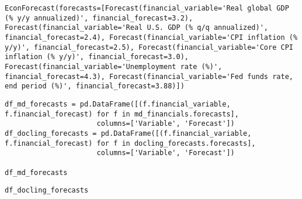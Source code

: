 \begin{verbatim}
EconForecast(forecasts=[Forecast(financial_variable='Real global GDP (% y/y annualized)', financial_forecast=3.2), Forecast(financial_variable='Real U.S. GDP (% q/q annualized)', financial_forecast=2.4), Forecast(financial_variable='CPI inflation (% y/y)', financial_forecast=2.5), Forecast(financial_variable='Core CPI inflation (% y/y)', financial_forecast=3.0), Forecast(financial_variable='Unemployment rate (%)', financial_forecast=4.3), Forecast(financial_variable='Fed funds rate, end period (%)', financial_forecast=3.88)])
\end{verbatim}


\begin{verbatim}
df_md_forecasts = pd.DataFrame([(f.financial_variable, f.financial_forecast) for f in md_financials.forecasts], 
                      columns=['Variable', 'Forecast'])
df_docling_forecasts = pd.DataFrame([(f.financial_variable, f.financial_forecast) for f in docling_forecasts.forecasts], 
                      columns=['Variable', 'Forecast'])

df_md_forecasts
\end{verbatim}




\begin{verbatim}
df_docling_forecasts
\end{verbatim}




